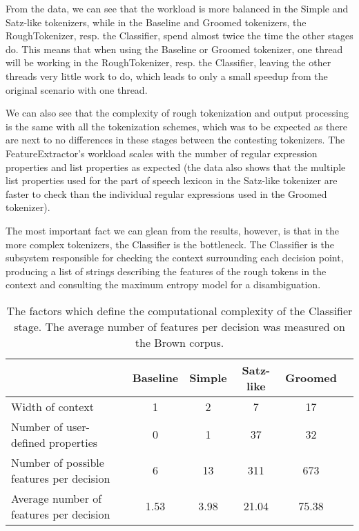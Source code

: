 From the data, we can see that the workload is more balanced in the Simple and
Satz-like tokenizers, while in the Baseline and Groomed tokenizers, the
RoughTokenizer, resp. the Classifier, spend almost twice the time the other
stages do. This means that when using the Baseline or Groomed tokenizer, one
thread will be working in the RoughTokenizer, resp. the Classifier, leaving the
other threads very little work to do, which leads to only a small speedup from
the original scenario with one thread.

We can also see that the complexity of rough tokenization and output processing
is the same with all the tokenization schemes, which was to be expected as
there are next to no differences in these stages between the contesting
tokenizers. The FeatureExtractor's workload scales with the number of regular
expression properties and list properties as expected (the data also shows that
the multiple list properties used for the part of speech lexicon in the
Satz-like tokenizer are faster to check than the individual regular expressions
used in the Groomed tokenizer).

The most important fact we can glean from the results, however, is that in the
more complex tokenizers, the Classifier is the bottleneck. The Classifier is
the subsystem responsible for checking the context surrounding each decision
point, producing a list of strings describing the features of the rough tokens
in the context and consulting the maximum entropy model for a disambiguation.

\begin{table}
  \begin{center}
    \begin{tabular}{ | l | c | c | c | c | c | }
      \hline
      & Baseline & Simple & Satz-like & Groomed \\ \hline
      Width of context & 1 & 2 & 7 & 17 \\ \hline
      Number of user-defined properties & 0 & 1 & 37 & 32 \\ \hline
      Number of possible features per decision & 6 & 13 & 311 & 673 \\ \hline
      Average number of features per decision & 1.53 & 3.98 & 21.04 & 75.38 \\
      \hline
    \end{tabular}
  \end{center}
  \caption[Compuational complexity of the Classifier stage]
    {The factors which define the computational complexity of the Classifier
    stage. The average number of features per decision was measured on the
    Brown corpus.}
  \label{tbl:classifier-load-factors}
\end{table}

